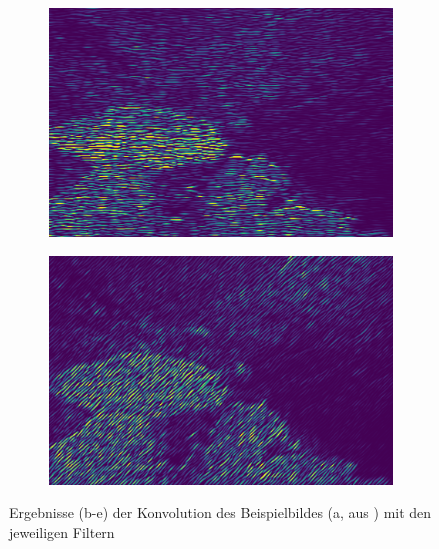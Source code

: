 \begin{figure}[h!]
\begin{subfigure}[t]{0.32\textwidth}
		\subcaption{}
	\end{subfigure}
	\hfill
	\begin{subfigure}[t]{0.32\textwidth}
		\centering
		\includegraphics[width=\textwidth,keepaspectratio]{images/gen/convolution/101027.jpg_2.png}
		\subcaption{}
	\end{subfigure}
	\hfill
	\begin{subfigure}[t]{0.32\textwidth}
		\centering
		\includegraphics[width=\textwidth,keepaspectratio]{images/gen/convolution/101027.jpg_3.png}
		\subcaption{}
	\end{subfigure}
	\hfill
	\begin{subfigure}[t]{0.32\textwidth}
		\hfill
	\end{subfigure}
	\caption{Ergebnisse (b-e) der Konvolution des Beispielbildes (a, aus \cite{bsd500}) mit den jeweiligen Filtern}
	\label{fig:tsugf_101027_raw}
\end{figure}

